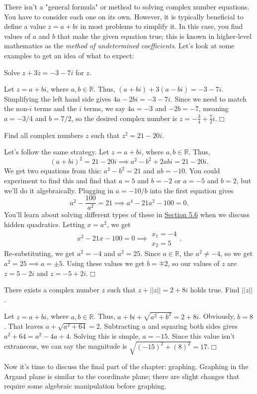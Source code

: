 \documentclass[../book.tex]{subfiles}
\begin{document}
There isn't a "general formula" or method to solving complex number equations.  You have to consider each one on its own.  However, it is typically beneficial to define a value $z=a+bi$ in most problems to simplify it.  In this case, you find values of $a$ and $b$ that make the given equation true; this is known in higher-level mathematics as the \textit{method of undetermined coefficients}.  Let's look at some examples to get an idea of what to expect:
\begin{example}
Solve $z+3\overline{z}=-3-7i$ for $z$.
\end{example}
\begin{solution}
Let $z=a+bi$, where $a,b\in\mathbb{R}$.  Thus, $\left(a+bi\right)+3\left(a-bi\right)=-3-7i$.  Simplifying the left hand side gives $4a-2bi=-3-7i$.  Since we need to match the non-$i$ terms and the $i$ terms, we say $4a=-3$ and $-2b=-7$, meaning $a=-3/4$ and $b=7/2$, so the desired complex number is $\displaystyle z=-\frac{3}{4}+\frac{7}{2}i$.$\Box$
\end{solution}
\begin{example}
Find all complex numbers $z$ such that $z^2=21-20i$.
\end{example}
\begin{solution}
Let's follow the same strategy.  Let $z=a+bi$, where $a,b\in\mathbb{R}$.  Thus, $$\left(a+bi\right)^2=21-20i \implies a^2-b^2+2abi=21-20i.$$  We get two equations from this: $a^2-b^2=21$ and $ab=-10$.  You could experiment to find this and find that $a=5$ and $b=-2$ or $a=-5$ and $b=2$, but we'll do it algebraically.  Plugging in $\displaystyle a=-10/b$ into the first equation gives $$\displaystyle a^2-\frac{100}{a^2}=21 \implies a^4-21a^2-100=0.$$  You'll learn about solving different types of these in \hyperlink{section.5.6}{Section 5.6} when we discuss hidden quadratics.  Letting $x=a^2$, we get $$x^2-21x-100=0 \implies \begin{matrix} x_1=-4 \\ x_2=5 \end{matrix}.$$  Re-substituting, we get $a^2=-4$ and $a^2=25$.  Since $a\in\mathbb{R}$, the $a^2\neq -4$, so we get $a^2=25 \implies a=\pm 5$.  Using these values we get $b=\mp 2$, so our values of $z$ are $z=5-2i$ and $z=-5+2i$.$\Box$
\end{solution}
\begin{example}
There exists a complex number $z$ such that $z+||z||=2+8i$ holds true.  Find $||z||$.
\end{example}
\begin{solution}
Let $z=a+bi$, where $a,b\in\mathbb{R}$.  Thus, $a+bi+\sqrt{a^2+b^2}=2+8i$.  Obviously, $b=8$.  That leaves $a+\sqrt{a^2+64}=2$.  Subtracting $a$ and squaring both sides gives $a^2+64=a^2-4a+4$.  Solving this is simple, $a=-15$.  Since this value isn't extraneous, we can say the magnitude is $\sqrt{\left(-15\right)^2+\left(8\right)^2}=17$.$\Box$
\end{solution}
\noindent Now it's time to discuss the final part of the chapter: graphing.  Graphing in the Argand plane is similar to the coordinate plane; there are slight changes that require some algebraic manipulation before graphing.
\end{document}
